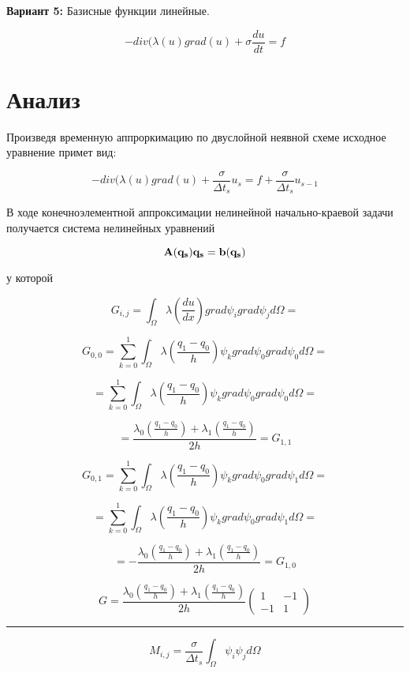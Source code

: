 \documentclass[12pt, a4paper]{article}
\begin{document}
{\bf Вариант 5:}
Базисные функции линейные.

\[ -div(\lambda(u)grad(u)+\sigma \frac{du}{dt} = f \]



\section{Анализ}

Произведя временную аппроркимацию  по двуслойной неявной схеме исходное уравнение примет вид:

\[ -div(\lambda(u)grad(u) + \frac{\sigma}{\Delta t_s} u_s = f + \frac{\sigma}{\Delta t_s} u_{s-1} \]


В ходе конечноэлементной аппроксимации нелинейной начально-краевой задачи получается система нелинейных уравнений

\[ { \bf A(q_s)q_s = b(q_s)} \]

у которой

\[ G_{i,j} = \int_{\Omega}{\lambda(\frac{du}{dx}) grad\psi_i grad\psi_j d\Omega} = \]

\[ G_{0,0} = \sum_{k=0}^{1} \int_{\Omega}{\lambda(\frac{q_1 - q_0}{h}) \psi_k grad\psi_0 grad\psi_0 d\Omega} = \]

\[ = \sum_{k=0}^{1} \int_{\Omega}{\lambda(\frac{q_1 - q_0}{h}) \psi_k grad\psi_0 grad\psi_0 d\Omega} =\]

\[ = \frac{\lambda_0(\frac{q_1-q_0}{h}) + \lambda_1(\frac{q_1-q_0}{h})}{2h} =  G_{1,1} \]

\[ G_{0,1} = \sum_{k=0}^{1} \int_{\Omega}{\lambda(\frac{q_1 - q_0}{h}) \psi_k grad\psi_0 grad\psi_1 d\Omega} = \]

\[ = \sum_{k=0}^{1} \int_{\Omega}{\lambda(\frac{q_1 - q_0}{h}) \psi_k grad\psi_0 grad\psi_1 d\Omega} = \]

\[ = -\frac{\lambda_0(\frac{q_1-q_0}{h}) + \lambda_1(\frac{q_1-q_0}{h})}{2h} = G_{1,0}\]

\[ G = \frac{\lambda_0(\frac{q_1-q_0}{h}) + \lambda_1(\frac{q_1-q_0}{h})}{2h}\begin{pmatrix} 1 & -1 \\ -1 & 1 \end{pmatrix} \]
\par\noindent\rule{\textwidth}{0.4pt}

\[ M_{i,j} = \frac{\sigma}{\Delta t_s}\int_{\Omega}{\psi_i\psi_jd\Omega} \]
\end{document}
